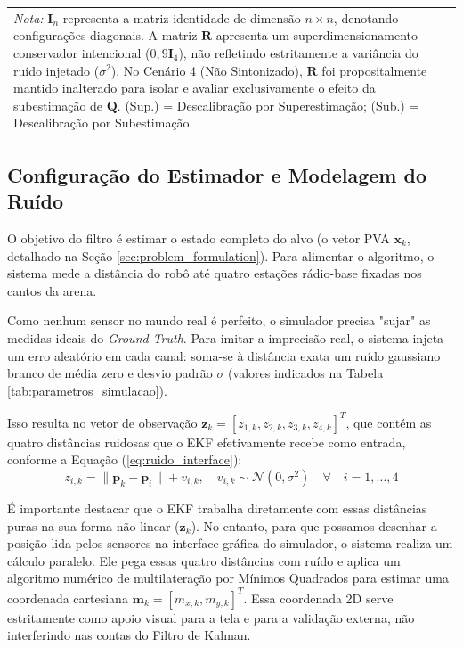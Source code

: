 \begin{table}[t!]
\begin{tabular}{lcccccc}
\multicolumn{7}{p{16cm}}{\scriptsize \textit{Nota:} $\mathbf{I}_{n}$ representa a matriz identidade de dimensão $n \times n$, denotando configurações diagonais. A matriz $\mathbf{R}$ apresenta um superdimensionamento conservador intencional ($0,9 \mathbf{I}_{4}$), não refletindo estritamente a variância do ruído injetado ($\sigma^2$). No Cenário 4 (Não Sintonizado), $\mathbf{R}$ foi propositalmente mantido inalterado para isolar e avaliar exclusivamente o efeito da subestimação de $\mathbf{Q}$. (Sup.) = Descalibração por Superestimação; (Sub.) = Descalibração por Subestimação.}
\end{tabular}
\end{table}

\subsection{Configuração do Estimador e Modelagem do Ruído}
\label{subsec:estimator_config}

O objetivo do filtro é estimar o estado completo do alvo (o vetor PVA $\mathbf{x}_k$, detalhado na Seção \ref{sec:problem_formulation}). Para alimentar o algoritmo, o sistema mede a distância do robô até quatro estações rádio-base fixadas nos cantos da arena.

Como nenhum sensor no mundo real é perfeito, o simulador precisa "sujar" as medidas ideais do \textit{Ground Truth}. Para imitar a imprecisão real, o sistema injeta um erro aleatório em cada canal: soma-se à distância exata um ruído gaussiano branco de média zero e desvio padrão $\sigma$ (valores indicados na Tabela \ref{tab:parametros_simulacao}). 

Isso resulta no vetor de observação $\mathbf{z}_k = [z_{1,k}, z_{2,k}, z_{3,k}, z_{4,k}]^T$, que contém as quatro distâncias ruidosas que o EKF efetivamente recebe como entrada, conforme a Equação (\ref{eq:ruido_interface}):
\begin{equation}
    z_{i,k} = \| \mathbf{p}_k - \mathbf{p}_{i} \| + v_{i,k}, \quad v_{i,k} \sim \mathcal{N}(0, \sigma^2) \quad \forall \quad i = 1, \dots, 4
    \label{eq:ruido_interface}
\end{equation}

É importante destacar que o EKF trabalha diretamente com essas distâncias puras na sua forma não-linear ($\mathbf{z}_k$). No entanto, para que possamos desenhar a posição lida pelos sensores na interface gráfica do simulador, o sistema realiza um cálculo paralelo. Ele pega essas quatro distâncias com ruído e aplica um algoritmo numérico de multilateração por Mínimos Quadrados para estimar uma coordenada cartesiana $\mathbf{m}_k = [m_{x,k}, m_{y,k}]^T$. Essa coordenada 2D serve estritamente como apoio visual para a tela e para a validação externa, não interferindo nas contas do Filtro de Kalman.

